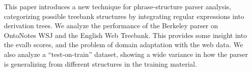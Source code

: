 This paper introduces a new technique for phrase-structure parser analysis, categorizing possible treebank structures by integrating regular expressions into derivation trees. We analyze the performance of the Berkeley parser on  OntoNotes WSJ and the English Web Treebank. This provides some insight into the evalb scores, and the problem of domain adaptation with the web data.  We also analyze a ``test-on-train'' dataset, showing a wide variance in how the parser is generalizing from different structures  in the training material.
